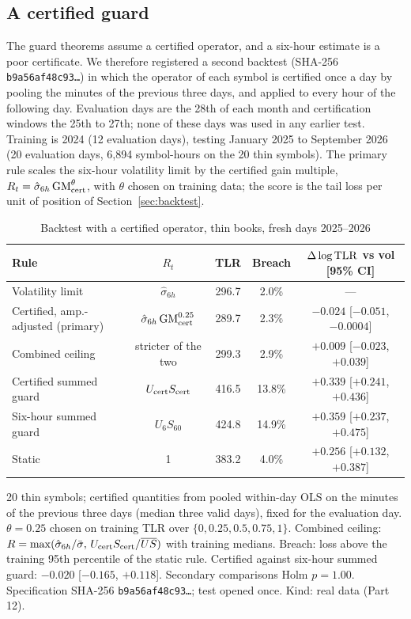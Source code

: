 \documentclass[12pt]{article}
\theoremstyle{definition}
\theoremstyle{remark}
\begin{document}
\subsection{A certified guard}\label{sec:certguard}
The guard theorems assume a certified operator, and a six-hour estimate is a poor certificate. We therefore registered a second backtest (SHA-256 \texttt{b9a56af48c93\ldots}) in which the operator of each symbol is certified once a day by pooling the minutes of the previous three days, and applied to every hour of the following day. Evaluation days are the 28th of each month and certification windows the 25th to 27th; none of these days was used in any earlier test. Training is 2024 (12 evaluation days), testing January 2025 to September 2026 (20 evaluation days, 6{,}894 symbol-hours on the 20 thin symbols). The primary rule scales the six-hour volatility limit by the certified gain multiple, $R_t=\hat\sigma_{6h}\,{\rm GM}_{\rm cert}^{\theta}$, with $\theta$ chosen on training data; the score is the tail loss per unit of position of Section~\ref{sec:backtest}.

\begin{table}[t]\centering\small
\begin{threeparttable}
\caption{Backtest with a certified operator, thin books, fresh days 2025--2026}\label{tab:certguard}
\setlength{\tabcolsep}{3pt}
\begin{tabular}{lcccc}
\toprule
Rule & $R_t$ & TLR & Breach & $\Delta\log{\rm TLR}$ vs vol [95\% CI]\\
\midrule
Volatility limit & $\hat\sigma_{6h}$ & 296.7 & 2.0\% & ---\\
Certified, amp.-adjusted (primary) & $\hat\sigma_{6h}\,{\rm GM}_{\rm cert}^{0.25}$ & 289.7 & 2.3\% & $-0.024$ [$-0.051$, $-0.0004$]\\
Combined ceiling & stricter of the two & 299.3 & 2.9\% & $+0.009$ [$-0.023$, $+0.039$]\\
Certified summed guard & $U_{\rm cert}S_{\rm cert}$ & 416.5 & 13.8\% & $+0.339$ [$+0.241$, $+0.436$]\\
Six-hour summed guard & $U_6S_{60}$ & 424.8 & 14.9\% & $+0.359$ [$+0.237$, $+0.475$]\\
Static & 1 & 383.2 & 4.0\% & $+0.256$ [$+0.132$, $+0.387$]\\
\bottomrule
\end{tabular}
\begin{tablenotes}\footnotesize\item 20 thin symbols; certified quantities from pooled within-day OLS on the minutes of the previous three days (median three valid days), fixed for the evaluation day. $\theta=0.25$ chosen on training TLR over $\{0,0.25,0.5,0.75,1\}$. Combined ceiling: $R=\max(\hat\sigma_{6h}/\bar\sigma,\,U_{\rm cert}S_{\rm cert}/\overline{US})$ with training medians. Breach: loss above the training 95th percentile of the static rule. Certified against six-hour summed guard: $-0.020$ [$-0.165$, $+0.118$]. Secondary comparisons Holm $p=1.00$. Specification SHA-256 \texttt{b9a56af48c93\ldots}; test opened once. Kind: real data (Part 12).\end{tablenotes}
\end{threeparttable}
\end{table}
\end{document}

